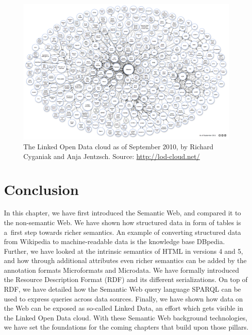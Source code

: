 \begin{figure}[htbp!]
\begin{center}
  \includegraphics[width=1.0\textwidth]{lod-cloud.png}    
  \caption[The Linked Open Data cloud as of September 2010.]{The Linked Open Data cloud as of September 2010, by Richard Cyganiak and Anja Jentzsch. Source: \url{http://lod-cloud.net/}}    
  \label{fig:lod-cloud}
  \end{center}  
\end{figure}

\section{Conclusion}
In this chapter, we have first introduced the Semantic Web,
and compared it to the non-semantic Web.
We have shown how structured data in form of tables
is a~first step towards richer semantics.
An example of converting structured data from Wikipedia
to machine-readable data is the knowledge base DBpedia.
Further, we have looked at the intrinsic semantics of HTML in versions 4 and 5,
and how through additional attributes even richer semantics can be added
by the annotation formats Microformats and Microdata.
We have formally introduced the Resource Description Format (RDF)
and its different serializations.
On top of RDF, we have detailed how the Semantic Web query language SPARQL
can be used to express queries across data sources.
Finally, we have shown how data on the Web can be exposed as so-called Linked Data,
an effort which gets visible in the Linked Open Data cloud.
With these Semantic Web background technologies,
we have set the foundations for the coming chapters that build upon those pillars.